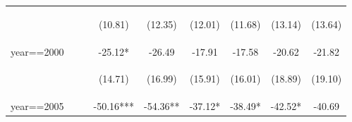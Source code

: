 \documentclass[10pt,letterpaper,subeqn, xcolor=table]{beamer}
\begin{document}
\begin{frame}[label=otherPANEL]
\begin{table}[htpb!]
\begin{center}
{\begin{tabular}{lcccccccc}
        & \begin{footnotesize}\end{footnotesize} & \begin{footnotesize}\end{footnotesize} & \begin{footnotesize}(10.81)\end{footnotesize} & \begin{footnotesize}(12.35)\end{footnotesize} & \begin{footnotesize}(12.01)\end{footnotesize} & \begin{footnotesize}(11.68)\end{footnotesize} & \begin{footnotesize}(13.14)\end{footnotesize} & \begin{footnotesize}(13.64)\end{footnotesize} \\

        year==2000&&&-25.12*&-26.49&-17.91&-17.58&-20.62&-21.82\\

        & \begin{footnotesize}\end{footnotesize} & \begin{footnotesize}\end{footnotesize} & \begin{footnotesize}(14.71)\end{footnotesize} & \begin{footnotesize}(16.99)\end{footnotesize} & \begin{footnotesize}(15.91)\end{footnotesize} & \begin{footnotesize}(16.01)\end{footnotesize} & \begin{footnotesize}(18.89)\end{footnotesize} & \begin{footnotesize}(19.10)\end{footnotesize} \\

        year==2005&&&-50.16***&-54.36**&-37.12*&-38.49*&-42.52*&-40.69\\


\end{tabular}}
\end{center}
\end{table}
\end{frame}
\end{document}

